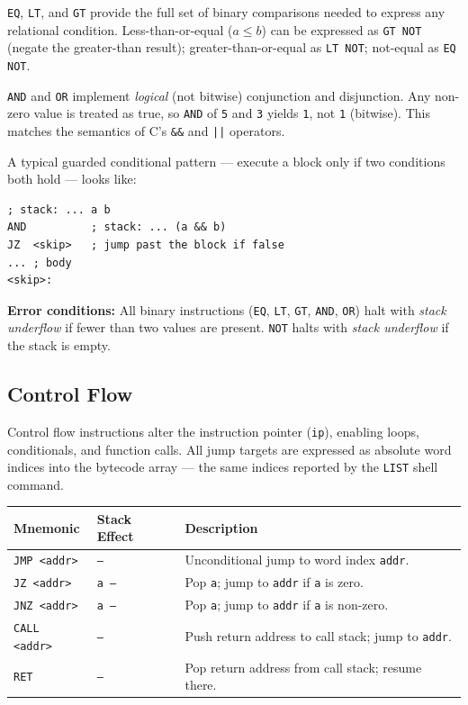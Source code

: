 \texttt{EQ}, \texttt{LT}, and \texttt{GT} provide the full set of binary comparisons needed to express any relational condition. Less-than-or-equal ($a \leq b$) can be expressed as \texttt{GT NOT} (negate the greater-than result); greater-than-or-equal as \texttt{LT NOT}; not-equal as \texttt{EQ NOT}.

\texttt{AND} and \texttt{OR} implement \textit{logical} (not bitwise) conjunction and disjunction. Any non-zero value is treated as true, so \texttt{AND} of \texttt{5} and \texttt{3} yields \texttt{1}, not \texttt{1} (bitwise). This matches the semantics of C's \texttt{\&\&} and \texttt{||} operators.

A typical guarded conditional pattern — execute a block only if two conditions both hold — looks like:

\begin{lstlisting}
; stack: ... a b
AND          ; stack: ... (a && b)
JZ  <skip>   ; jump past the block if false
... ; body
<skip>:
\end{lstlisting}

\textbf{Error conditions:} All binary instructions (\texttt{EQ}, \texttt{LT}, \texttt{GT}, \texttt{AND}, \texttt{OR}) halt with \textit{stack underflow} if fewer than two values are present. \texttt{NOT} halts with \textit{stack underflow} if the stack is empty.

\subsection{Control Flow}

Control flow instructions alter the instruction pointer (\texttt{ip}), enabling loops, conditionals, and function calls. All jump targets are expressed as absolute word indices into the bytecode array — the same indices reported by the \texttt{LIST} shell command.

\begin{center}
\begin{tabular}{lll}
\toprule
\textbf{Mnemonic}   & \textbf{Stack Effect} & \textbf{Description} \\
\midrule
\texttt{JMP <addr>}  & \texttt{--}      & Unconditional jump to word index \texttt{addr}. \\
\texttt{JZ  <addr>}  & \texttt{a --}    & Pop \texttt{a}; jump to \texttt{addr} if \texttt{a} is zero. \\
\texttt{JNZ <addr>}  & \texttt{a --}    & Pop \texttt{a}; jump to \texttt{addr} if \texttt{a} is non-zero. \\
\texttt{CALL <addr>} & \texttt{--}      & Push return address to call stack; jump to \texttt{addr}. \\
\texttt{RET}         & \texttt{--}      & Pop return address from call stack; resume there. \\
\bottomrule
\end{tabular}
\end{center}


